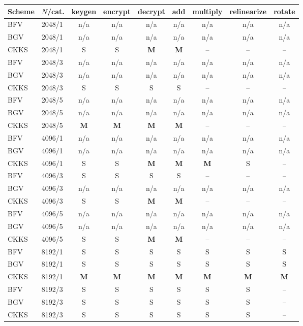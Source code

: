 \begin{longtable}{@{}llccccccc@{}}
\toprule
Scheme & $N$/cat. & keygen & encrypt & decrypt & add & multiply & relinearize & rotate \\
\midrule
\endhead
BFV & 2048/1 & n/a & n/a & n/a & n/a & n/a & n/a & n/a \\
BGV & 2048/1 & n/a & n/a & n/a & n/a & n/a & n/a & n/a \\
CKKS & 2048/1 & S & S & \textbf{M} & \textbf{M} & -- & -- & -- \\
BFV & 2048/3 & n/a & n/a & n/a & n/a & n/a & n/a & n/a \\
BGV & 2048/3 & n/a & n/a & n/a & n/a & n/a & n/a & n/a \\
CKKS & 2048/3 & S & S & S & S & -- & -- & -- \\
BFV & 2048/5 & n/a & n/a & n/a & n/a & n/a & n/a & n/a \\
BGV & 2048/5 & n/a & n/a & n/a & n/a & n/a & n/a & n/a \\
CKKS & 2048/5 & \textbf{M} & \textbf{M} & \textbf{M} & \textbf{M} & -- & -- & -- \\
BFV & 4096/1 & n/a & n/a & n/a & n/a & n/a & n/a & n/a \\
BGV & 4096/1 & n/a & n/a & n/a & n/a & n/a & n/a & n/a \\
CKKS & 4096/1 & S & S & \textbf{M} & \textbf{M} & \textbf{M} & S & -- \\
BFV & 4096/3 & S & S & S & S & -- & -- & -- \\
BGV & 4096/3 & n/a & n/a & n/a & n/a & n/a & n/a & n/a \\
CKKS & 4096/3 & S & S & \textbf{M} & \textbf{M} & -- & -- & -- \\
BFV & 4096/5 & n/a & n/a & n/a & n/a & n/a & n/a & n/a \\
BGV & 4096/5 & n/a & n/a & n/a & n/a & n/a & n/a & n/a \\
CKKS & 4096/5 & S & S & \textbf{M} & \textbf{M} & -- & -- & -- \\
BFV & 8192/1 & S & S & S & S & S & S & S \\
BGV & 8192/1 & S & S & S & S & S & S & S \\
CKKS & 8192/1 & \textbf{M} & \textbf{M} & \textbf{M} & \textbf{M} & \textbf{M} & \textbf{M} & \textbf{M} \\
BFV & 8192/3 & S & S & S & S & S & S & -- \\
BGV & 8192/3 & S & S & S & S & S & S & -- \\
CKKS & 8192/3 & S & S & S & S & S & S & -- \\

\end{longtable}

